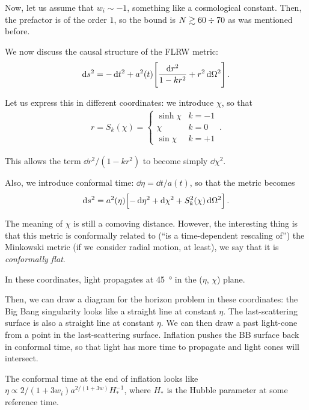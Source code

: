 \documentclass[main.tex]{subfiles}
\begin{document}
Now, let us assume that \(w_i \sim -1\), something like a cosmological constant. Then, the prefactor is of the order \(1\), so the bound is \(N \gtrsim 60 \divisionsymbol 70\) as was mentioned before. 

We now discuss the causal structure of the FLRW metric: 
%
\begin{align}
\dd{s^2} = - \dd{t^2} + a^2(t) \qty[ \frac{ \dd{r^2}}{1 - kr^2} + r^2 \dd{\Omega^2}]
\,.
\end{align}

Let us express this in different coordinates: we introduce \(\chi \), so that 
%
\begin{align}
r = S_k (\chi ) = \begin{cases}
    \sinh \chi & k = -1  \\
    \chi & k = 0 \\
    \sin \chi & k = +1
\end{cases}
\,.
\end{align}

This allows the term \(\dd{r^2} / (1 - kr^2)\) to become simply \(\dd{\chi^2}\). 

Also, we introduce conformal time: \(\dd{\eta } = \dd{t} / a(t)\), so that the metric becomes 
%
\begin{align}
\dd{s^2} = a^2(\eta ) \qty[- \dd{ \eta^2} + \dd{\chi^2} + S_k^2 (\chi ) \dd{\Omega^2}]
\,.
\end{align}

The meaning of \(\chi \) is still a comoving distance. 
However, the interesting thing is that this metric is conformally related to (``is a time-dependent rescaling of'') the Minkowski metric (if we consider radial motion, at least), we say that it is \emph{conformally flat}.

In these coordinates, light propagates at \SI{45}{\degree} in the (\(\eta \), \(\chi \)) plane. 

Then, we can draw a diagram for the horizon problem in these coordinates: the Big Bang singularity looks like a straight line at constant \(\eta \). 
The last-scattering surface is also a straight line at constant \(\eta \).
We can then draw a past light-cone from a point in the last-scattering surface. Inflation pushes the BB surface back in conformal time, so that light has more time to propagate and light cones will intersect. 

\begin{claim}
The conformal time at the end of inflation looks like \(\eta \propto 2 / (1 + 3 w_i) a^{2 / (1 + 3w)} H_*^{-1}\), where \(H_*\) is the Hubble parameter at some reference time. 
\end{claim}
\end{document}

